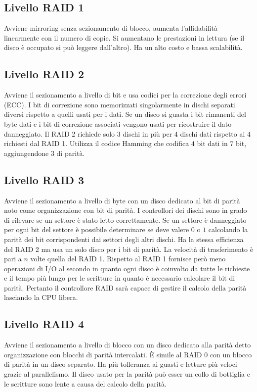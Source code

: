 \subsection{Livello RAID 1}
Avviene mirroring senza sezionamento di blocco, aumenta l'affidabilit\`a linearmente con il numero di copie. Si aumentano le prestazioni in lettura (se il disco \`e occupato si pu\`o 
leggere dall'altro). Ha un alto costo e bassa scalabilit\`a. 
\subsection{Livello RAID 2}
Avviene il sezionamento a livello di bit e usa codici per la correzione degli errori (ECC). I bit di correzione sono memorizzati singolarmente in dischi separati diversi rispetto a 
quelli usati per i dati. Se un disco si guasta i bit rimanenti del byte dati e i bit di correzione associati vengono usati per ricostruire il dato danneggiato. Il RAID 2 richiede solo 
$3$ dischi in pi\`u per $4$ dischi dati rispetto ai $4$ richiesti dal RAID 1. Utilizza il codice Hamming che codifica $4$ bit dati in $7$ bit, aggiungendone $3$ di parit\`a. 
\subsection{Livello RAID 3}
Avviene il sezionamento a livello di byte con un disco dedicato al bit di parit\`a noto come organizzazione con bit di parit\`a. I controllori dei dischi sono in grado di rilevare se 
un settore \`e stato letto correttamente. Se un settore \`e danneggiato per ogni bit del settore \`e possibile determinare se deve valere $0$ o $1$ calcolando la parit\`a dei bit
corrispondenti dai settori degli altri dischi. Ha la stessa efficienza del RAID 2 ma usa un solo disco per i bit di parit\`a. La velocit\`a di trasferimento \`e pari a $n$ volte quella
del RAID 1. Rispetto al RAID 1 fornisce per\`o meno operazioni di I/O al secondo in quanto ogni disco \`e coinvolto da tutte le richieste e il tempo pi\`u lungo per le scritture in
quanto \`e necessario calcolare il bit di parit\`a. Pertanto il controllore RAID sar\`a capace di gestire il calcolo della parit\`a lasciando la CPU libera. 
\subsection{Livello RAID 4}
Avviene il sezionamento a livello di blocco con un disco dedicato alla parit\`a detto organizzazione con blocchi di parit\`a intercalati. \`E simile al RAID 0 con un blocco di parit\`a
in un disco separato. Ha pi\`u tolleranza ai guasti e letture pi\`u veloci grazie al parallelismo. Il disco usato per la parit\`a pu\`o esser un collo di bottiglia e le scritture sono
lente a causa del calcolo della parit\`a. 
